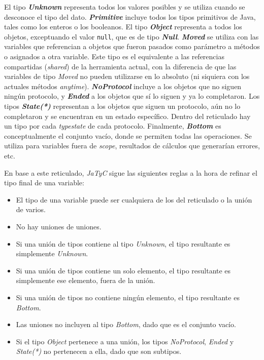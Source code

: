 El tipo \textbf{\textit{Unknown}} representa todos los valores posibles y se utiliza cuando se desconoce el tipo del dato. \textbf{\textit{Primitive}} incluye todos los tipos primitivos de Java, tales como los enteros o los booleanos. El tipo \textbf{\textit{Object}} representa a todos los objetos, exceptuando el valor \texttt{null}, que es de tipo \textbf{\textit{Null}}. \textbf{\textit{Moved}} se utiliza con las variables que referencian a objetos que fueron pasados como parámetro a métodos o asignados a otra variable. Este tipo es el equivalente a las referencias compartidas (\textit{shared}) de la herramienta actual, con la diferencia de que las variables de tipo \textit{Moved} no pueden utilizarse en lo absoluto (ni siquiera con los actuales métodos \textit{anytime}). \textbf{\textit{NoProtocol}} incluye a los objetos que no siguen ningún protocolo, y \textbf{\textit{Ended}} a los objetos que sí lo siguen y ya lo completaron. Los tipos \textbf{\textit{State(*)}} representan a los objetos que siguen un protocolo, aún no lo completaron y se encuentran en un estado específico. Dentro del reticulado hay un tipo por cada \textit{typestate} de cada protocolo. Finalmente, \textbf{\textit{Bottom}} es conceptualmente el conjunto vacío, donde se permiten todas las operaciones. Se utiliza para variables fuera de \textit{scope}, resultados de cálculos que generarían errores, etc.

En base a este reticulado, \textit{JaTyC} sigue las siguientes reglas a la hora de refinar el tipo final de una variable:

\begin{itemize}
    \item El tipo de una variable puede ser cualquiera de los del reticulado o la unión de varios.
    \item No hay uniones de uniones.
    \item Si una unión de tipos contiene al tipo \textit{Unknown}, el tipo resultante es simplemente \textit{Unknown}.
    \item Si una unión de tipos contiene un solo elemento, el tipo resultante es simplemente ese elemento, fuera de la unión.
    \item Si una unión de tipos no contiene ningún elemento, el tipo resultante es \textit{Bottom}.
    \item Las uniones no incluyen al tipo \textit{Bottom}, dado que es el conjunto vacío.
    \item Si el tipo \textit{Object} pertenece a una unión, los tipos \textit{NoProtocol}, \textit{Ended} y \textit{State(*)} no pertenecen a ella, dado que son subtipos.
\end{itemize}


